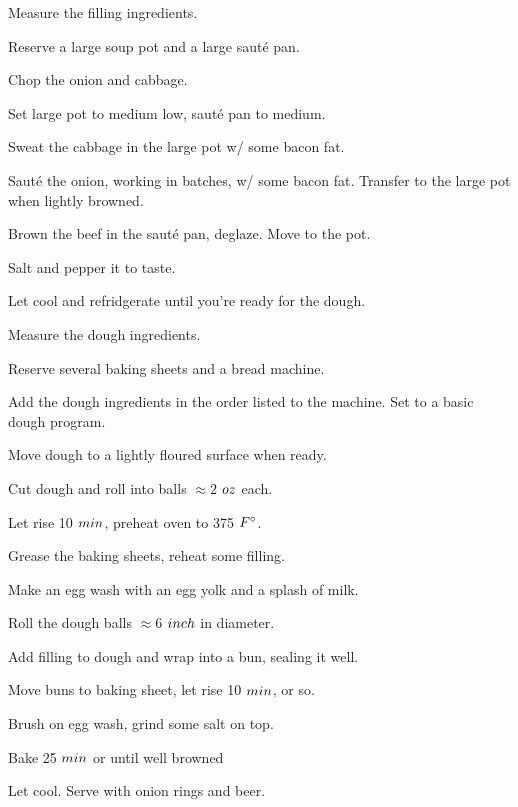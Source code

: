 \begin{preparation}
\item Measure the filling ingredients.
\item Reserve a large soup pot and a large saut\'{e} pan.
\item Chop the onion and cabbage.
\item Set large pot to medium low, saut\'{e} pan to medium.
\item Sweat the cabbage in the large pot w/ some bacon fat.
\item Saut\'{e} the onion, working in batches, w/ some bacon fat.
    Transfer to the large pot when lightly browned.
\item Brown the beef in the saut\'{e} pan, deglaze.
    Move to the pot.
\item Salt and pepper it to taste.
\item Let cool and refridgerate until you're ready for the dough.
\item Measure the dough ingredients.
\item Reserve several baking sheets and a bread machine.
\item Add the dough ingredients in the order listed to the machine.
    Set to a basic dough program.
\item Move dough to a lightly floured surface when ready.
\item Cut dough and roll into balls $\approx 2$ $\ounce$ each.
\item Let rise 10 $\minute$, preheat oven to 375 $\Fahrenheit$.
\item Grease the baking sheets, reheat some filling.
\item Make an egg wash with an egg yolk and a splash of milk.
\item Roll the dough balls $\approx 6$ $\inch$ in diameter.
\item Add filling to dough and wrap into a bun, sealing it well.
\item Move buns to baking sheet, let rise 10 $\minute$, or so.
\item Brush on egg wash, grind some salt on top.
\item Bake 25 $\minute$ or until well browned
\item Let cool. Serve with onion rings and beer.
\end{preparation}

\recipeend%

